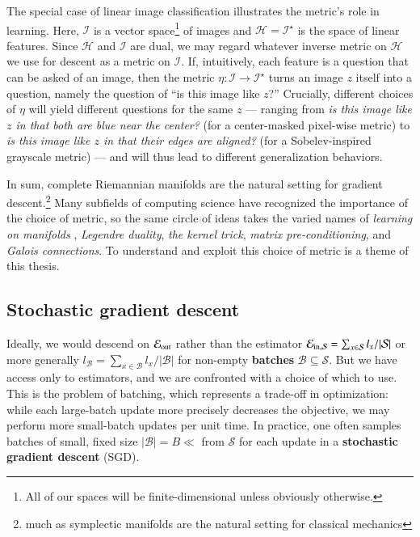 \documentclass[openany, notitlepage, justified]{tufte-book}
\theoremstyle{plain}
\theoremstyle{definition}
\newcommand{\Bb}{\mathcal{B}}
\newcommand{\Hh}{\mathcal{H}}
\newcommand{\Ii}{\mathcal{I}}
\newcommand{\Ss}{\mathcal{S}}
\begin{document}
        The special case of linear image classification illustrates the
        metric's role in learning.  Here, $\Ii$ is a 
        vector space\footnote{
            All of our spaces will be finite-dimensional unless
            obviously otherwise.
        } of images and $\Hh = \Ii^\star$ is the space of linear features.
        Since $\Hh$ and $\Ii$ are dual, we may regard whatever inverse metric
        on $\Hh$ we use for descent as a metric on $\Ii$.  If, intuitively,
        each feature is a question that can be asked of an image, then the
        metric $\eta:\Ii\to\Ii^\star$ turns an image $z$ itself into a
        question, namely the question of ``is this image like $z$?''  Crucially,
        different choices of $\eta$ will yield different questions for the same
        $z$ ---
        ranging from
        \emph{is this image like $z$ in that both are blue near the center?}
        (for a center-masked pixel-wise metric)
        to
        \emph{is this image like $z$ in that their edges are aligned?}
        (for a Sobelev-inspired grayscale metric)
        --- and will thus lead to different generalization behaviors. 

        In sum, complete Riemannian manifolds are the natural
        setting for gradient descent.\footnote{
            much as symplectic manifolds are the natural setting for classical
            mechanics
        }
        Many subfields of computing science have recognized the importance
        of the choice of metric,
        so the same circle of ideas takes the varied names of \emph{learning on
        manifolds} \citep{bo13}, \emph{Legendre duality}, \emph{the kernel
        trick}, \emph{matrix pre-conditioning}, and \emph{Galois
        connections}.
        To understand and exploit this choice of metric is a theme of this
        thesis. 

        \subsection{Stochastic gradient descent}

            Ideally, we would descend on $\mathcal{E}_{\text{out}}$ rather than the estimator
            $\Ein = \sum_{x\in\Ss} l_x/|\Ss|$ or more generally $l_\Bb =
            \sum_{x\in\Bb} l_x/|\Bb|$ for non-empty \textbf{batches}
            $\Bb\subseteq\Ss$.  But we have access only to estimators, and we
            are confronted with a choice of which to use.  This is the problem
            of batching, which represents a trade-off in optimization: while
            each large-batch update more precisely decreases the objective, we
            may perform more small-batch updates per unit time.  In practice,
            one often samples batches of small, fixed size $|\Bb|=B \ll $ from
            $\Ss$ for each update in a \textbf{stochastic gradient descent}
            (SGD).
\end{document}

